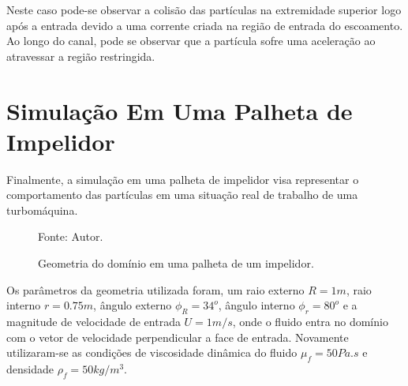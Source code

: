 Neste caso pode-se observar a colisão das partículas na extremidade superior logo após a entrada devido a uma corrente criada na região de entrada do escoamento.
Ao longo do canal, pode se observar que a partícula sofre uma aceleração ao atravessar a região restringida.

\section{\textbf{Simulação Em Uma Palheta de Impelidor}}
\label{sec_rotor}
Finalmente, a simulação em uma palheta de impelidor visa representar o comportamento das partículas em uma situação real de trabalho de uma turbomáquina.

\begin{figure}[H]
    \centering
     {\raggedleft \scriptsize Fonte: Autor.}
    \caption{Geometria do domínio em uma palheta de um impelidor.}
    \label{rotor_geometry}
\end{figure}

Os parâmetros da geometria utilizada foram, um raio externo $R=1m$, raio interno $r=0.75m$, ângulo externo $\phi_R=34^o$, ângulo interno $\phi_r=80^o$ e a magnitude de velocidade de entrada $U=1m/s$, onde o fluido entra no domínio com o vetor de velocidade perpendicular a face de entrada.
Novamente utilizaram-se as condições de viscosidade dinâmica do fluido $\mu_f=50Pa.s$ e densidade $\rho_f=50kg/m^3$.

